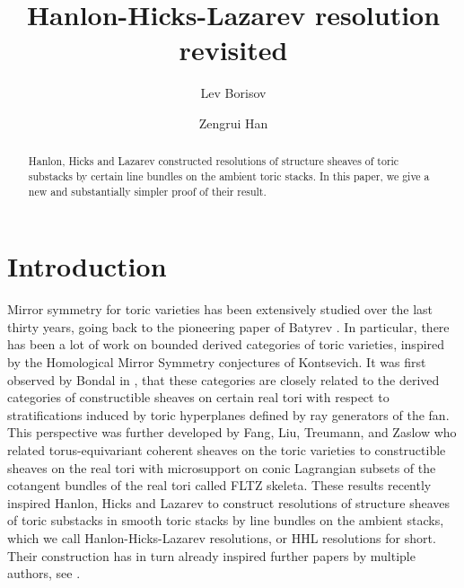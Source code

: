 \documentclass[11pt,reqno]{amsart}
\theoremstyle{definition}
\numberwithin{equation}{section}
\begin{document}
\title{Hanlon-Hicks-Lazarev resolution revisited}

\begin{abstract}
    Hanlon, Hicks and Lazarev constructed resolutions of structure sheaves of toric substacks by certain line bundles on the ambient toric stacks. In this paper, we give a new and substantially simpler proof of their result.
\end{abstract}

\author{Lev Borisov}
\address{Department of Mathematics\\
Rutgers University\\
Piscataway, NJ 08854} 

\author{Zengrui Han}
\address{Department of Mathematics\\
University of Maryland\\
College Park, MD 20742} 


\maketitle
\tableofcontents


\section{Introduction}


Mirror symmetry for toric varieties has been extensively studied  over the last thirty years, going back to the pioneering paper of Batyrev \cite{Batdual}. In particular, there has been a lot of work on bounded derived categories of toric varieties, inspired by the Homological Mirror Symmetry conjectures of Kontsevich.
It  was first observed by Bondal  in \cite{Bondal}, that these  categories are closely related to the derived categories of  constructible sheaves on certain real tori  with respect to stratifications induced by toric hyperplanes defined by ray generators of the fan. This perspective was further developed by Fang, Liu, Treumann, and Zaslow \cite{FLTZ} who related torus-equivariant coherent sheaves on the toric varieties to constructible sheaves on the real tori with microsupport on conic Lagrangian subsets of the cotangent bundles of the real tori called FLTZ skeleta. 
These results recently inspired Hanlon, Hicks and Lazarev \cite{HHL} to construct resolutions of structure sheaves of toric substacks in smooth toric stacks by line bundles on the ambient stacks, which we call Hanlon-Hicks-Lazarev resolutions, or HHL resolutions for short. Their construction has in turn already inspired further papers by multiple authors, see \cite{BBB+,BE,FS,Heller}.
\end{document}
